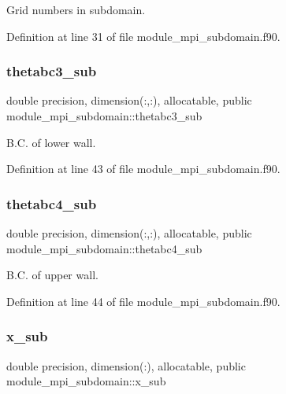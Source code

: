 Grid numbers in subdomain. 



Definition at line 31 of file module\+\_\+mpi\+\_\+subdomain.\+f90.

\mbox{\label{namespacemodule__mpi__subdomain_a64208c4f25ace4acb038e217cc784f02}} 
\subsubsection{\texorpdfstring{thetabc3\_sub}{thetabc3\_sub}}
{\footnotesize\ttfamily double precision, dimension(\+:,\+:), allocatable, public module\+\_\+mpi\+\_\+subdomain\+::thetabc3\+\_\+sub}



B.\+C. of lower wall. 



Definition at line 43 of file module\+\_\+mpi\+\_\+subdomain.\+f90.

\mbox{\label{namespacemodule__mpi__subdomain_a63ecab89051a64282880083d20844204}} 
\subsubsection{\texorpdfstring{thetabc4\_sub}{thetabc4\_sub}}
{\footnotesize\ttfamily double precision, dimension(\+:,\+:), allocatable, public module\+\_\+mpi\+\_\+subdomain\+::thetabc4\+\_\+sub}



B.\+C. of upper wall. 



Definition at line 44 of file module\+\_\+mpi\+\_\+subdomain.\+f90.

\mbox{\label{namespacemodule__mpi__subdomain_a514fad372aeabc519f09899d384c90f4}} 
\subsubsection{\texorpdfstring{x\_sub}{x\_sub}}
{\footnotesize\ttfamily double precision, dimension(\+:), allocatable, public module\+\_\+mpi\+\_\+subdomain\+::x\+\_\+sub}



